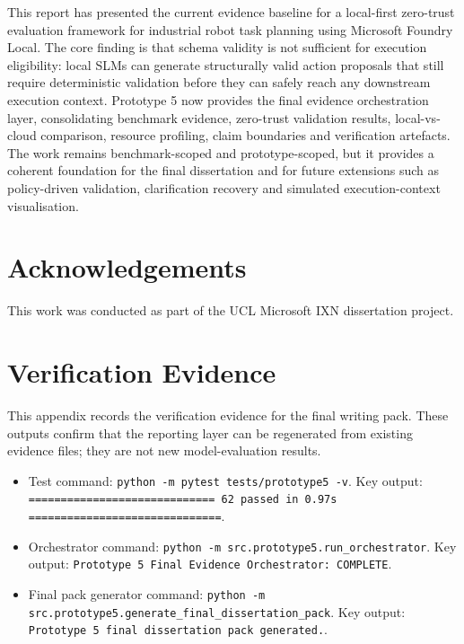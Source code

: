 \documentclass[sigconf,nonacm]{acmart}
\begin{document}
This report has presented the current evidence baseline for a local-first zero-trust evaluation framework for industrial robot task planning using Microsoft Foundry Local. The core finding is that schema validity is not sufficient for execution eligibility: local SLMs can generate structurally valid action proposals that still require deterministic validation before they can safely reach any downstream execution context. Prototype 5 now provides the final evidence orchestration layer, consolidating benchmark evidence, zero-trust validation results, local-vs-cloud comparison, resource profiling, claim boundaries and verification artefacts. The work remains benchmark-scoped and prototype-scoped, but it provides a coherent foundation for the final dissertation and for future extensions such as policy-driven validation, clarification recovery and simulated execution-context visualisation.

\section*{Acknowledgements}
This work was conducted as part of the UCL Microsoft IXN dissertation project.





\appendix


\section{Verification Evidence}
\label{sec:appendix_verification_evidence}

This appendix records the verification evidence for the final writing pack. These outputs confirm that the reporting layer can be regenerated from existing evidence files; they are not new model-evaluation results.

\begin{itemize}
    \item Test command: \texttt{python -m pytest tests/prototype5 -v}. Key output: \texttt{============================= 62 passed in 0.97s ==============================}.
    \item Orchestrator command: \texttt{python -m src.prototype5.run_orchestrator}. Key output: \texttt{Prototype 5 Final Evidence Orchestrator: COMPLETE}.
    \item Final pack generator command: \texttt{python -m src.prototype5.generate_final_dissertation_pack}. Key output: \texttt{Prototype 5 final dissertation pack generated.}.
\end{itemize}
\end{document}
